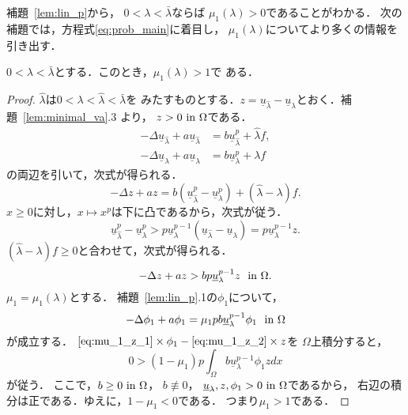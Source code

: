 補題~\ref{lem:lin_p}から，
$0 < \lambda < \bar{\lambda}$ならば
$\mu_1(\lambda) > 0$であることがわかる．
次の補題では，方程式\ref{eq:prob_main}に着目し，
$\mu_1(\lambda)$についてより多くの情報を引き出す．

\begin{lem} \label{lem:lin_1}
 $0 < \lambda < \bar{\lambda}$とする．このとき，$\mu_1(\lambda) > 1$で
 ある．
\end{lem}

\begin{proof}
 $\hat{\lambda}$は$0 < \lambda < \hat{\lambda} < \bar{\lambda}$を
 みたすものとする．$z = \underline{u}_{\hat{\lambda}} -
 \underline{u}_\lambda$とおく．補題~\ref{lem:minimal_va}.3 より，
 $z > 0 ~\text{in}~ \Omega$である．
 \begin{align*}
  -\Delta \underline{u}_{\hat{\lambda}} + a \underline{u}_{\hat{\lambda}} &= b
  \underline{u}_{\hat{\lambda}}^p + \hat{\lambda} f, \\   
  -\Delta \underline{u}_{\lambda} + a \underline{u}_\lambda &= b
  \underline{u}_\lambda^p + \lambda f
 \end{align*}
 の両辺を引いて，次式が得られる．
 \[
  -\Delta z + az = b (\underline{u}_{\hat{\lambda}}^p -
 \underline{u}_\lambda^p)
 + (\hat{\lambda} - \lambda) f.
 \]
 $x \geq 0$に対し，$x \mapsto x^p$は下に凸であるから，次式が従う．
 \[
  \underline{u}_{\hat{\lambda}}^p - \underline{u}_\lambda^p > 
 p \underline{u}_\lambda^{p-1} (\underline{u}_{\hat{\lambda}} -
 \underline{u}_\lambda) = p \underline{u}_\lambda^{p-1} z.
 \]
 $(\hat{\lambda} - \lambda) f \geq 0$と合わせて，次式が得られる．
 \begin{equation}
  -\Delta z + az > bp \underline{u}_\lambda^{p-1} z  \ \ \text{in}~ \Omega.
   \label{eq:mu_1_z_1}
 \end{equation}
 $\mu_1 = \mu_1(\lambda)$とする．
 補題~\ref{lem:lin_p}.1の$\phi_1$について，
 \begin{equation}
  -\Delta \phi_1 + a \phi_1 =
   \mu_1 p b \underline{u}_\lambda^{p-1} \phi_1  \ \ \text{in}~ \Omega
   \label{eq:mu_1_z_2}
 \end{equation}
 が成立する．
 $ \text{\eqref{eq:mu_1_z_1}} \times \phi_1 - 
 \text{\eqref{eq:mu_1_z_2}} \times z$を
 $\Omega$上積分すると，
 \[
  0 > (1 - \mu_1) p \int_\Omega b \underline{u}_\lambda^{p-1} \phi_1 z dx
 \]
 が従う．
 ここで，$b \geq 0 ~\text{in}~ \Omega$，
 $b \not \equiv 0$，
 $\underline{u}_\lambda, z, \phi_1 > 0 ~\text{in}~ \Omega$であるから，
 右辺の積分は正である．ゆえに，$1 - \mu_1 < 0$である．
 つまり$\mu_1 > 1$である． \qedhere
\end{proof}

